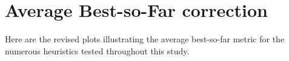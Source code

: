 
\chapter{Average Best-so-Far correction}
\label{Appendix:AvgBestSoFarCorrection}

Here are the revised plots illustrating the average best-so-far metric for the numerous heuristics tested throughout this study.


